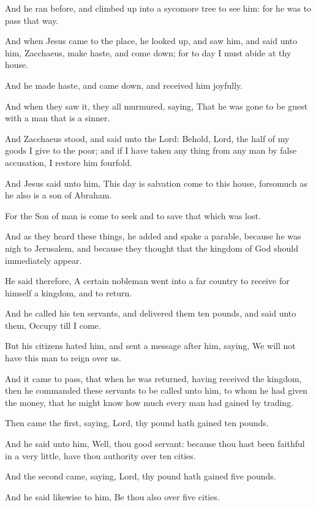 \Verse And he ran before, and climbed up into a sycomore tree to see him: for he was to pass that way.

\Verse And when Jesus came to the place, he looked up, and saw him, and said unto him, Zacchaeus, make haste, and come down; for to day I must abide at thy house.

\Verse And he made haste, and came down, and received him joyfully.

\Verse And when they saw it, they all murmured, saying, That he was gone to be guest with a man that is a sinner.

\Verse And Zacchaeus stood, and said unto the Lord: Behold, Lord, the half of my goods I give to the poor; and if I have taken any thing from any man by false accusation, I restore him fourfold.

\Verse And Jesus said unto him, This day is salvation come to this house, forsomuch as he also is a son of Abraham.

\Verse For the Son of man is come to seek and to save that which was lost.

\Verse And as they heard these things, he added and spake a parable, because he was nigh to Jerusalem, and because they thought that the kingdom of God should immediately appear.

\Verse He said therefore, A certain nobleman went into a far country to receive for himself a kingdom, and to return.

\Verse And he called his ten servants, and delivered them ten pounds, and said unto them, Occupy till I come.

\Verse But his citizens hated him, and sent a message after him, saying, We will not have this man to reign over us.

\Verse And it came to pass, that when he was returned, having received the kingdom, then he commanded these servants to be called unto him, to whom he had given the money, that he might know how much every man had gained by trading.

\Verse Then came the first, saying, Lord, thy pound hath gained ten pounds.

\Verse And he said unto him, Well, thou good servant: because thou hast been faithful in a very little, have thou authority over ten cities.

\Verse And the second came, saying, Lord, thy pound hath gained five pounds.

\Verse And he said likewise to him, Be thou also over five cities.

